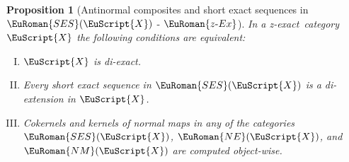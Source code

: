 \documentclass [12pt,oneside]{book}%
\theoremstyle{captionstyle}  %
\newtheorem{proposition}[theorem]{Proposition}
\newenvironment{tfae}{		%
	\begin{enumerate}[(I)]}{
	\end{enumerate}
}
\newcommand{\hy}{\text{-}}													%
\newcommand{\Ctgry}[1]{\EuScript{#1}}					%
\newcommand{\ZExact}{z-exact}									%
\newcommand{\NMonoCat}[1]{\EuRoman{NM}(\Ctgry{#1})}				%
\newcommand{\NEpiCat}[1]{\EuRoman{NE}(\Ctgry{#1})}				%
\newcommand{\SESCat}[1]{\EuRoman{SES}(\Ctgry{#1})}				%
\newcommand{\ZExactTag}{ - {\color{Cerulean} $\EuRoman{z\hy Ex}$}}
\begin{document}
\begin{proposition}[Antinormal composites and short exact sequences in $\SESCat{X}$\ZExactTag]
    \label{thm:ANN<->PointwiseSES}%
    In a \ZExact\ category $\Ctgry{X}$ the following conditions are equivalent:
    \begin{tfae}
        \item \label{thm:ANN<->PointwiseSES-DiExact}%
        $\Ctgry{X}$ is di-exact.
        \item \label{thm:ANN<->PointwiseSES-SESInSES(X)}%
        Every short exact sequence in $\SESCat{X}$  is a di-extension in $\Ctgry{X}$.
        \item \label{thm:ANN<->PointwiseSES-(Co)Ker(Normal)}%
        Cokernels and kernels of normal maps in any of the categories $\SESCat{X}$, $\NEpiCat{X}$, and $\NMonoCat{X}$ are computed object-wise.
    \end{tfae}
\end{proposition}
\end{document}
